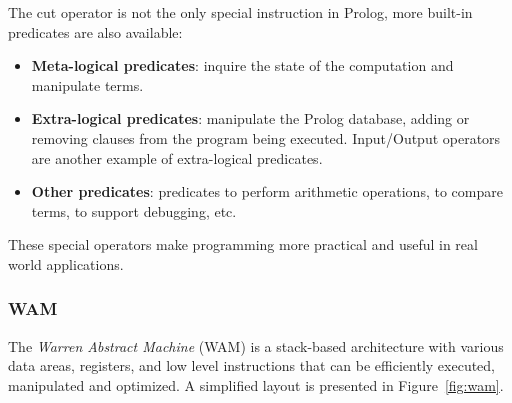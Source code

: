The cut operator is not the only special instruction in Prolog, more built-in predicates are also available:

\begin{itemize}
  \item \textbf{Meta-logical predicates}: inquire the state of the computation and manipulate terms.
  \item \textbf{Extra-logical predicates}: manipulate the Prolog database, adding or removing clauses from
  the program being executed. Input/Output operators are another example of extra-logical predicates.
  \item \textbf{Other predicates}: predicates to perform arithmetic operations, to compare terms, to support debugging, etc.
\end{itemize}

These special operators make programming more practical and useful in real world applications.

\subsubsection{WAM}

The \textit{Warren Abstract Machine} (WAM) is a stack-based architecture
with various data areas, registers, and low level instructions that can be efficiently executed, manipulated and optimized.
A simplified layout is presented in Figure~\ref{fig:wam}.

